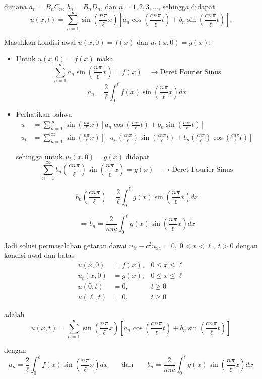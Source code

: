 \documentclass[a4paper]{article}
\theoremstyle{definition}
\begin{document}
dimana \( a_n = B_n C_n \), \( b_n = B_n D_n \), dan \( n = 1, 2, 3, \ldots \), sehingga didapat
\[
u(x,t) = \sum_{n=1}^{\infty} \sin\left( \frac{n\pi}{\ell}x \right) \left[ a_n \cos\left( \frac{cn\pi}{\ell}t \right) + b_n \sin\left( \frac{cn\pi}{\ell}t \right) \right]. \tag{3.165}
\]

Masukkan kondisi awal \( u(x,0) = f(x) \) dan \( u_t(x,0) = g(x) \):

\begin{itemize}
  \item Untuk \( u(x,0) = f(x) \) maka
  \[
  \sum_{n=1}^{\infty} a_n \sin\left( \frac{n\pi}{\ell}x \right) = f(x) \quad \rightarrow \text{Deret Fourier Sinus}
  \]
  \[
  a_n = \frac{2}{\ell} \int_0^{\ell} f(x) \sin\left( \frac{n\pi}{\ell}x \right) dx \tag{3.166}
  \]

  \item Perhatikan bahwa
  \begin{align*}
  u &= \sum_{n=1}^{\infty} \sin\left( \frac{n\pi}{\ell}x \right) \left[ a_n \cos\left( \frac{cn\pi}{\ell}t \right) + b_n \sin\left( \frac{cn\pi}{\ell}t \right) \right] \\
  u_t &= \sum_{n=1}^{\infty} \sin\left( \frac{n\pi}{\ell}x \right) \left[ -a_n \left( \frac{cn\pi}{\ell} \right) \sin\left( \frac{cn\pi}{\ell}t \right) + b_n \left( \frac{cn\pi}{\ell} \right) \cos\left( \frac{cn\pi}{\ell}t \right) \right]
  \end{align*}

  sehingga untuk \( u_t(x,0) = g(x) \) didapat
  \[
  \sum_{n=1}^{\infty} b_n \left( \frac{cn\pi}{\ell} \right) \sin\left( \frac{n\pi}{\ell}x \right) = g(x) \quad \rightarrow \text{Deret Fourier Sinus}
  \]

  \[
  b_n \left( \frac{cn\pi}{\ell} \right) = \frac{2}{\ell} \int_0^{\ell} g(x) \sin\left( \frac{n\pi}{\ell}x \right) dx
  \]

  \[
  \Rightarrow b_n = \frac{2}{n\pi c} \int_0^{\ell} g(x) \sin\left( \frac{n\pi}{\ell}x \right) dx \tag{3.168}
  \]
\end{itemize}

Jadi solusi permasalahan getaran dawai \( u_{tt} - c^2 u_{xx} = 0, \; 0 < x < \ell, \; t > 0 \) dengan kondisi awal dan batas
\[
\begin{aligned}
u(x,0) &= f(x), & 0 \le x \le \ell \\
u_t(x,0) &= g(x), & 0 \le x \le \ell \\
u(0,t) &= 0, & t \ge 0 \\
u(\ell,t) &= 0, & t \ge 0
\end{aligned}
\]

adalah
\[
u(x,t) = \sum_{n=1}^{\infty} \sin\left( \frac{n\pi}{\ell}x \right) \left[ a_n \cos\left( \frac{cn\pi}{\ell}t \right) + b_n \sin\left( \frac{cn\pi}{\ell}t \right) \right]
\]

dengan
\[
a_n = \frac{2}{\ell} \int_0^{\ell} f(x) \sin\left( \frac{n\pi}{\ell}x \right) dx
\qquad\text{dan}\qquad
b_n = \frac{2}{n\pi c} \int_0^{\ell} g(x) \sin\left( \frac{n\pi}{\ell}x \right) dx
\]
\end{document}
